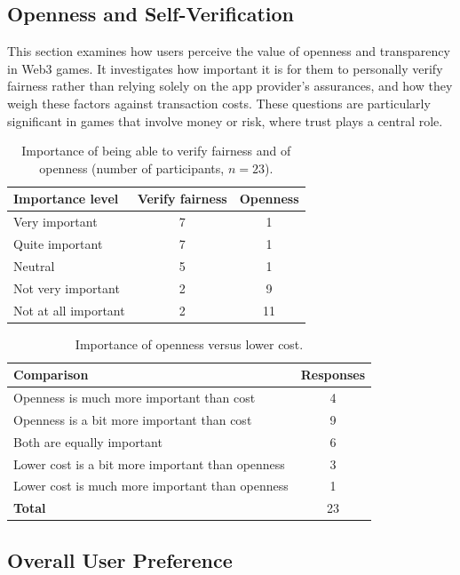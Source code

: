 \documentclass[10pt,conference]{IEEEtran}
\begin{document}
\subsection{Openness and Self-Verification}
This section examines how users perceive the value of openness and transparency in Web3 games. It investigates how important it is for them to personally verify fairness rather than relying solely on the app provider’s assurances, and how they weigh these factors against transaction costs. These questions are particularly significant in games that involve money or risk, where trust plays a central role.

\begin{table}[h!]
\centering
\caption{Importance of being able to verify fairness and of openness (number of participants, $n=23$).}
\label{tab:verify_openness}
\setlength{\tabcolsep}{6pt}
\begin{tabular}{@{}lcc@{}}
\hline
\textbf{Importance level} & \textbf{Verify fairness} & \textbf{Openness} \\
\hline
Very important            & 7 & 1 \\
Quite important           & 7 & 1 \\
Neutral                   & 5 & 1 \\
Not very important       & 2 & 9 \\
Not at all important     & 2 & 11 \\
\hline
\end{tabular}
\end{table}


\begin{table}[h!]
\centering
\caption{Importance of openness versus lower cost.}
\begin{tabular}{l c}
\hline
\textbf{Comparison} & \textbf{Responses} \\
\hline
Openness is much more important than cost & 4 \\
Openness is a bit more important than cost & 9 \\
Both are equally important & 6 \\
Lower cost is a bit more important than openness & 3 \\
Lower cost is much more important than openness & 1 \\
\hline
\textbf{Total} & 23 \\
\hline
\end{tabular}
\end{table}

\subsection{Overall User Preference}
\end{document}
